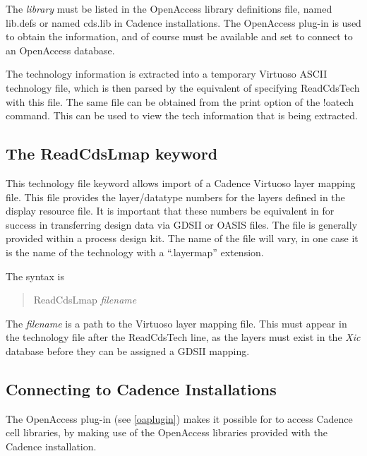 The {\it library} must be listed in the OpenAccess library
definitions file, named {\vt lib.defs} or named {\vt cds.lib} in
Cadence installations.  The OpenAccess plug-in is used to obtain the
information, and of course must be available and set to connect to an
OpenAccess database.
 
The technology information is extracted into a temporary Virtuoso
ASCII technology file, which is then parsed by the equivalent of
specifying {\vt ReadCdsTech} with this file.  The same file can be
obtained from the print option of the {\cb !oatech} command.  This
can be used to view the tech information that is being extracted.


\subsection{The {\vt ReadCdsLmap} keyword}
This technology file keyword allows import of a Cadence Virtuoso layer
mapping file.  This file provides the layer/datatype numbers for the
layers defined in the display resource file.  It is important that
these numbers be equivalent in {\Xic} for success in transferring
design data via GDSII or OASIS files.  The file is generally provided
within a process design kit.  The name of the file will vary, in one
case it is the name of the technology with a ``{\vt .layermap}''
extension. 

The syntax is 
\begin{quote}
{\vt ReadCdsLmap} {\it filename}
\end{quote}
       
The {\it filename} is a path to the Virtuoso layer mapping file.  This
must appear in the {\Xic} technology file after the {\vt ReadCdsTech}
line, as the layers must exist in the {\it Xic} database before they
can be assigned a GDSII mapping. 

\subsection{Connecting to Cadence Installations}

The OpenAccess plug-in (see \ref{oaplugin}) makes it possible for
{\Xic} to access Cadence cell libraries, by making use of the
OpenAccess libraries provided with the Cadence installation.

